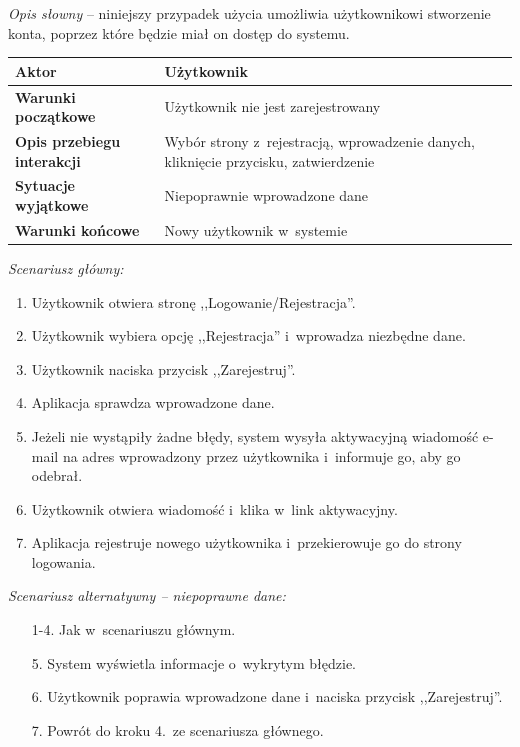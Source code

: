 \textit{Opis słowny} -- niniejszy przypadek użycia umożliwia użytkownikowi stworzenie konta, poprzez które będzie miał
on dostęp do systemu.

\begin{longtable}{|p{5cm}|p{8cm}|}
  \hline \textbf{Aktor} & Użytkownik \\ \hline
  \textbf{Warunki początkowe} & Użytkownik nie jest zarejestrowany \\ \hline
  \textbf{Opis przebiegu interakcji} & Wybór strony z~rejestracją, wprowadzenie danych, kliknięcie przycisku,
  zatwierdzenie \\ \hline
  \textbf{Sytuacje wyjątkowe} & Niepoprawnie wprowadzone dane \\ \hline
  \textbf{Warunki końcowe} & Nowy użytkownik w~systemie \\ \hline
\end{longtable}

\noindent \textit{Scenariusz główny:}
\begin{enumerate}
  \item Użytkownik otwiera stronę ,,Logowanie/Rejestracja''.
  \item Użytkownik wybiera opcję ,,Rejestracja'' i~wprowadza niezbędne dane.
  \item Użytkownik naciska przycisk ,,Zarejestruj''.
  \item Aplikacja sprawdza wprowadzone dane.
  \item Jeżeli nie wystąpiły żadne błędy, system wysyła aktywacyjną wiadomość e-mail na adres wprowadzony przez użytkownika i~informuje go, aby go odebrał.
  \item Użytkownik otwiera wiadomość i~klika w~link aktywacyjny.
  \item Aplikacja rejestruje nowego użytkownika i~przekierowuje go do strony logowania.
\end{enumerate}

\noindent \textit{Scenariusz alternatywny -- niepoprawne dane:}
\begin{enumerate}
  \item[1-4.] Jak w~scenariuszu głównym.
  \item[5.] System wyświetla informacje o~wykrytym błędzie.
  \item[6.] Użytkownik poprawia wprowadzone dane i~naciska przycisk ,,Zarejestruj''.
  \item[7.] Powrót do kroku 4.~ze scenariusza głównego.
\end{enumerate}

